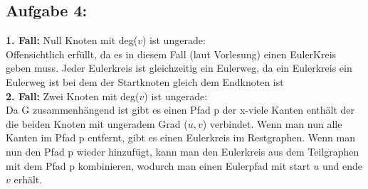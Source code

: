 \documentclass[a4paper]{article}
\begin{document}
\subsection*{Aufgabe 4:}
\textbf{1. Fall:} Null Knoten mit deg($v$) ist ungerade: \\
Offensichtlich erfüllt, da es in diesem Fall (laut Vorlesung) einen 
EulerKreis geben muss. Jeder Eulerkreis ist gleichzeitig ein 
Eulerweg, da ein Eulerkreis ein Eulerweg ist bei dem der Startknoten
gleich dem Endknoten ist \\
\textbf{2. Fall:} Zwei Knoten mit deg($v$) ist ungerade: \\
Da G zusammenhängend ist gibt es einen Pfad p der x-viele Kanten enthält
der die beiden Knoten mit ungeradem Grad ($u, v$) verbindet. Wenn man nun 
alle Kanten im Pfad p entfernt, gibt es einen Eulerkreis im Restgraphen.
Wenn man nun den Pfad p wieder hinzufügt, kann man den Eulerkreis aus dem 
Teilgraphen mit dem Pfad p kombinieren, wodurch man einen Eulerpfad
mit start $u$ und ende $v$ erhält.
\end{document}
